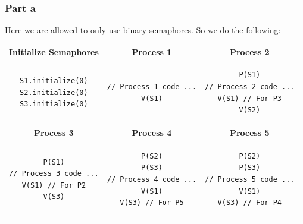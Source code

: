 \documentclass[english]{article}
\begin{document}
\subsubsection*{Part a}
Here we are allowed to only use binary semaphores. So we do the following:
\begin{table}[ht!]
\begin{tabular}{|c|c|c|}
\hline
\textbf{Initialize Semaphores} & \textbf{Process 1} & \textbf{Process 2}  \\

\begin{lstlisting}
S1.initialize(0)
S2.initialize(0)
S3.initialize(0)
\end{lstlisting}
 & 
 \begin{lstlisting}
// Process 1 code ...
V(S1)
\end{lstlisting}
& 
\begin{lstlisting}
P(S1)
// Process 2 code ...
V(S1) // For P3
V(S2)
\end{lstlisting} \\ \hline \hline
\textbf{Process 3} & \textbf{Process 4} & \textbf{Process 5} \\

\begin{lstlisting}
P(S1)
// Process 3 code ...
V(S1) // For P2
V(S3)
\end{lstlisting}
& 
\begin{lstlisting}
P(S2)
P(S3)
// Process 4 code ...
V(S1)
V(S3) // For P5
\end{lstlisting}
&
\begin{lstlisting}
P(S2)
P(S3)
// Process 5 code ...
V(S1)
V(S3) // For P4
\end{lstlisting} \\\hline

\end{tabular}
\end{table}
\end{document}
